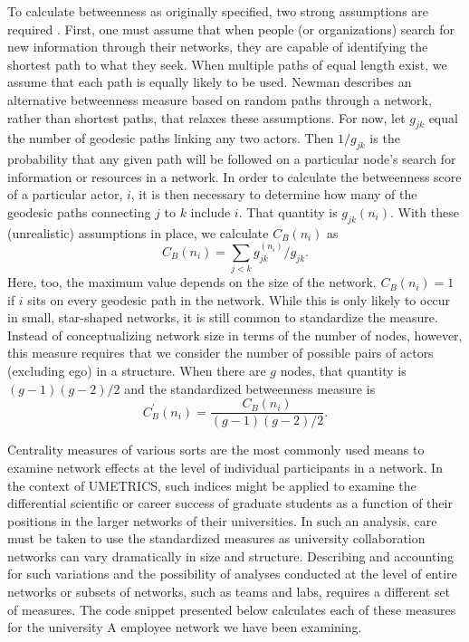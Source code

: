 \documentclass[]{krantz}
\begin{document}
To calculate betweenness as originally specified, two strong assumptions
are required \citep{freeman1979centrality}. First, one must assume that
when people (or organizations) search for new information through their
networks, they are capable of identifying the shortest path to what they
seek. When multiple paths of equal length exist, we assume that each
path is equally likely to be used. Newman
\citeyearpar{newman2005measure} describes an alternative betweenness
measure based on random paths through a network, rather than shortest
paths, that relaxes these assumptions. For now, let \(g_{jk}\) equal the
number of geodesic paths linking any two actors. Then \(1/g_{jk}\) is
the probability that any given path will be followed on a particular
node's search for information or resources in a network. In order to
calculate the betweenness score of a particular actor, \(i\), it is then
necessary to determine how many of the geodesic paths connecting \(j\)
to \(k\) include \(i\). That quantity is \(g_{jk}(n_{i})\). With these
(unrealistic) assumptions in place, we calculate \(C_{B}(n_{i})\) as
\[C_B(n_i)=\sum_{j<k} g_{jk}^{(n_i)}/g_{jk}.\] Here, too, the maximum
value depends on the size of the network. \(C_{B}(n_{i}) = 1\) if \(i\)
sits on every geodesic path in the network. While this is only likely to
occur in small, star-shaped networks, it is still common to standardize
the measure. Instead of conceptualizing network size in terms of the
number of nodes, however, this measure requires that we consider the
number of possible pairs of actors (excluding ego) in a structure. When
there are \(g\) nodes, that quantity is \((g-1)(g-2)/2\) and the
standardized betweenness measure is
\[C_B^{\prime}(n_i)=\frac{C_B(n_i)}{(g-1)(g-2)/2}.\]

Centrality measures of various sorts are the most commonly used means to
examine network effects at the level of individual participants in a
network. In the context of UMETRICS, such indices might be applied to
examine the differential scientific or career success of graduate
students as a function of their positions in the larger networks of
their universities. In such an analysis, care must be taken to use the
standardized measures as university collaboration networks can vary
dramatically in size and structure. Describing and accounting for such
variations and the possibility of analyses conducted at the level of
entire networks or subsets of networks, such as teams and labs, requires
a different set of measures. The code snippet presented below calculates
each of these measures for the university A employee network we have
been examining.
\end{document}
